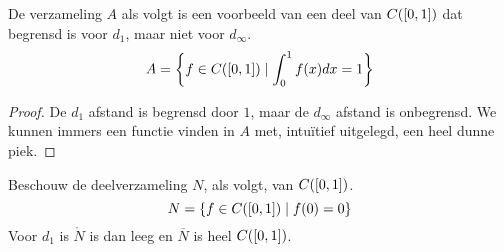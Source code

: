 \documentclass[main.tex]{subfiles}
\begin{document}
\begin{vb}
  De verzameling $A$ als volgt is een voorbeeld van een deel van $C(\interval{0}{1})$ dat begrensd is voor $d_{1}$, maar niet voor $d_{\infty}$.
  \[ A = \left\{ f \in C(\interval{0}{1}) \mid \int_{0}^{1}f(x)dx = 1 \right\}\]

  \begin{proof}
    De $d_{1}$ afstand is begrensd door $1$, maar de $d_{\infty}$ afstand is onbegrensd.
    We kunnen immers een functie vinden in $A$ met, intu\"itief uitgelegd, een heel dunne piek.
  \end{proof}
\end{vb}

\begin{vb}
  Beschouw de deelverzameling $N$, als volgt, van $C(\interval{0}{1})$.
  \[ N = \{ f \in C(\interval{0}{1}) \mid f(0) = 0 \} \]
  Voor $d_{1}$ is $\mathring{N}$ is dan leeg en $\overline{N}$ is heel $C(\interval{0}{1})$.


\end{vb}
\end{document}
